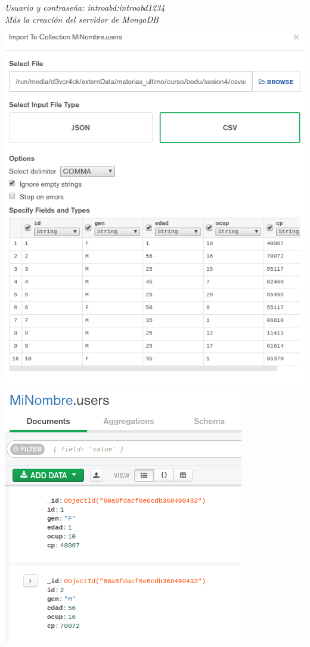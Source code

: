 \documentclass[10pt]{article}
\begin{document}
\begin{center}
  \textit{Usuario y contraseña: introabd:introabd1234\\Más la creación del servidor de MongoDB}\\
  \includegraphics[scale=0.25]{imgs/9.png}\\
  \includegraphics[scale=0.25]{imgs/10.png}\\

\end{center}
\end{document}
